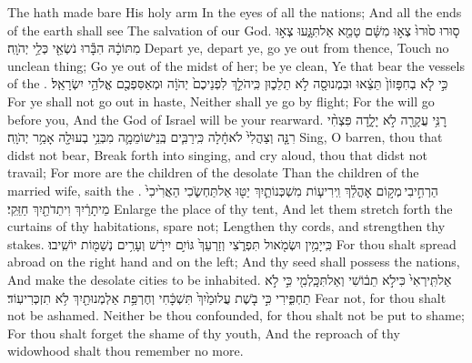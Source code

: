 {The \lord\space hath made bare His holy arm In the eyes of all the nations; And all the ends of the earth shall see The salvation of our God.}
{ס֤וּרוּ ס֙וּרוּ֙ צְא֣וּ מִשָּׁ֔ם טָמֵ֖א אַל\maqqaf תִּגָּ֑עוּ צְא֣וּ מִתּוֹכָ֔הּ הִבָּ֕רוּ נֹשְׂאֵ֖י כְּלֵ֥י יְהֹוָֽה׃}
{Depart ye, depart ye, go ye out from thence, Touch no unclean thing; Go ye out of the midst of her; be ye clean, Ye that bear the vessels of the \lord.}
{כִּ֣י לֹ֤א בְחִפָּזוֹן֙ תֵּצֵ֔אוּ וּבִמְנוּסָ֖ה לֹ֣א תֵלֵכ֑וּן כִּֽי\maqqaf הֹלֵ֤ךְ לִפְנֵיכֶם֙ יְהֹוָ֔ה וּמְאַסִּפְכֶ֖ם אֱלֹהֵ֥י יִשְׂרָאֵֽל׃ \setuma }
{For ye shall not go out in haste, Neither shall ye go by flight; For the \lord\space will go before you, And the God of Israel will be your rearward.}
\newperek
{}
\label{haft_49}
\setcounter{chap}{54}
\setcounter{verse}{1}
{רׇנִּ֥י עֲקָרָ֖ה לֹ֣א יָלָ֑דָה פִּצְחִ֨י רִנָּ֤ה וְצַהֲלִי֙ לֹא\maqqaf חָ֔לָה כִּֽי\maqqaf רַבִּ֧ים בְּֽנֵי\maqqaf שׁוֹמֵמָ֛ה מִבְּנֵ֥י בְעוּלָ֖ה אָמַ֥ר יְהֹוָֽה׃}
{Sing, O barren, thou that didst not bear, Break forth into singing, and cry aloud, thou that didst not travail; For more are the children of the desolate Than the children of the married wife, saith the \lord.}
{הַרְחִ֣יבִי \legarmeh  מְק֣וֹם אׇהֳלֵ֗ךְ וִֽירִיע֧וֹת מִשְׁכְּנוֹתַ֛יִךְ יַטּ֖וּ אַל\maqqaf תַּחְשֹׂ֑כִי הַאֲרִ֙יכִי֙ מֵיתָרַ֔יִךְ וִיתֵדֹתַ֖יִךְ חַזֵּֽקִי׃}
{Enlarge the place of thy tent, And let them stretch forth the curtains of thy habitations, spare not; Lengthen thy cords, and strengthen thy stakes.}
{כִּֽי\maqqaf יָמִ֥ין וּשְׂמֹ֖אול תִּפְרֹ֑צִי וְזַרְעֵךְ֙ גּוֹיִ֣ם יִירָ֔שׁ וְעָרִ֥ים נְשַׁמּ֖וֹת יוֹשִֽׁיבוּ׃}
{For thou shalt spread abroad on the right hand and on the left; And thy seed shall possess the nations, And make the desolate cities to be inhabited.}
{אַל\maqqaf תִּֽירְאִי֙ כִּי\maqqaf לֹ֣א תֵב֔וֹשִׁי וְאַל\maqqaf תִּכָּֽלְמִ֖י כִּ֣י לֹ֣א תַחְפִּ֑ירִי כִּ֣י בֹ֤שֶׁת עֲלוּמַ֙יִךְ֙ תִּשְׁכָּ֔חִי וְחֶרְפַּ֥ת אַלְמְנוּתַ֖יִךְ לֹ֥א תִזְכְּרִי\maqqaf עֽוֹד׃}
{Fear not, for thou shalt not be ashamed. Neither be thou confounded, for thou shalt not be put to shame; For thou shalt forget the shame of thy youth, And the reproach of thy widowhood shalt thou remember no more.}
